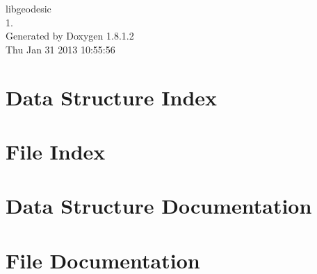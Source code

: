 \documentclass{article}
\begin{document}
\hypersetup{pageanchor=false,citecolor=blue}
\begin{titlepage}
\vspace*{7cm}
\begin{center}
{\Large libgeodesic \\[1ex]\large 1. }\\
\vspace*{1cm}
{\large Generated by Doxygen 1.8.1.2}\\
\vspace*{0.5cm}
{\small Thu Jan 31 2013 10:55:56}\\
\end{center}
\end{titlepage}
\tableofcontents
{}
\hypersetup{pageanchor=true,citecolor=blue}
\section{Data Structure Index}

\section{File Index}

\section{Data Structure Documentation}











\section{File Documentation}
























\printindex
\end{document}

